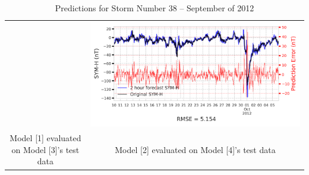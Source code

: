 \documentclass[draft,sw]{agutexSI2019}
\begin{document}
\begin{table}
\begin{tabular}{cc}
&
\includegraphics[width=0.49\linewidth]{paper_plots/2h_swics_model_on_no_swics/2h_swics_model_on_no_swics_storm_38.png}
\\
Model [1] evaluated on Model [3]'s test data & Model [2] evaluated on Model [4]'s test data
\vspace*{12pt}
\\
\end{tabular}
\caption{Predictions for Storm Number 38 -- September of 2012}
\label{storm-38}
\end{table}
\end{document}
